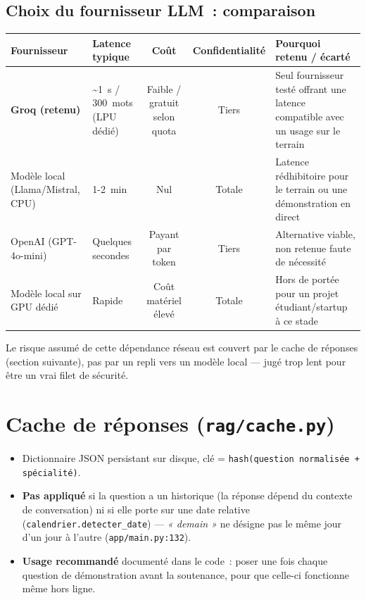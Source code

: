 \documentclass[11pt]{article}
\begin{document}
\subsection*{Choix du fournisseur LLM~: comparaison}

\begin{tabularx}{\textwidth}{@{}l Y c c Y@{}}
\toprule
\textbf{Fournisseur} & \textbf{Latence typique} & \textbf{Coût} & \textbf{Confidentialité} & \textbf{Pourquoi retenu / écarté} \\
\midrule
\textbf{Groq (retenu)} & \textasciitilde1~s / 300~mots (LPU dédié) & Faible / gratuit selon quota & Tiers & Seul fournisseur testé offrant une latence compatible avec un usage sur le terrain \\
Modèle local (Llama/Mistral, CPU) & 1-2~min & Nul & Totale & Latence rédhibitoire pour le terrain ou une démonstration en direct \\
OpenAI (GPT-4o-mini) & Quelques secondes & Payant par token & Tiers & Alternative viable, non retenue faute de nécessité \\
Modèle local sur GPU dédié & Rapide & Coût matériel élevé & Totale & Hors de portée pour un projet étudiant/startup à ce stade \\
\bottomrule
\end{tabularx}

\vspace{0.5em}
Le risque assumé de cette dépendance réseau est couvert par le cache de réponses (section
suivante), pas par un repli vers un modèle local --- jugé trop lent pour être un vrai filet de
sécurité.

\section{Cache de réponses (\texttt{rag/cache.py})}

\begin{itemize}
  \item Dictionnaire JSON persistant sur disque, clé = \texttt{hash(question normalisée +
        spécialité)}.
  \item \textbf{Pas appliqué} si la question a un historique (la réponse dépend du contexte de
        conversation) ni si elle porte sur une date relative (\texttt{calendrier.detecter\_date})
        --- \textit{« demain »} ne désigne pas le même jour d'un jour à l'autre
        (\texttt{app/main.py:132}).
  \item \textbf{Usage recommandé} documenté dans le code~: poser une fois chaque question de
        démonstration avant la soutenance, pour que celle-ci fonctionne même hors ligne.
\end{itemize}
\end{document}

